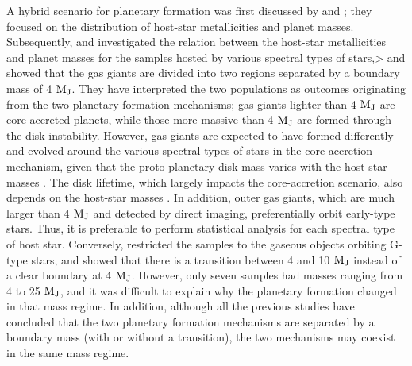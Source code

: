 \documentclass[twocolumn]{aastex62}
\begin{document}
\begin{CJK*}{UTF8}{min}
A hybrid scenario for planetary formation was first discussed by \cite{2007A&A...464..779R} and \cite{2007ApJ...662.1282M}; they focused on the distribution of host-star metallicities and planet masses. Subsequently, \cite{2017A&A...603A..30S} and \cite{2018AJ....156..221N} investigated the relation between the host-star metallicities and planet masses for the samples hosted by various spectral types of stars,> and showed that the gas giants are divided into two regions separated by a boundary mass of 4 $\rm M_J$. They have interpreted the two populations as outcomes originating from the two planetary formation mechanisms; gas giants lighter than 4 $\rm M_J$ are core-accreted planets, while those more massive than 4 $\rm M_J$ are formed through the disk instability. However, gas giants are expected to have formed differently and evolved around the various spectral types of stars in the core-accretion mechanism, given that the proto-planetary disk mass varies with the host-star masses \citep{2005ApJ...626.1045I}. The disk lifetime, which largely impacts the core-accretion scenario, also depends on the host-star masses \citep{2015A&A...576A..52R}. In addition, outer gas giants, which are much larger than 4 $\rm M_J$ and detected by direct imaging, preferentially orbit early-type stars. Thus, it is preferable to perform statistical analysis for each spectral type of host star. Conversely, \cite{2018ApJ...853...37S} restricted the samples to the gaseous objects orbiting G-type stars, and showed that there is a transition between 4 and 10 $\rm M_J$ instead of a clear boundary at 4 $\rm M_J$. However, only seven samples had masses ranging from 4 to 25 $\rm M_J$, and it was difficult to explain why the planetary formation changed in that mass regime. In addition, although all the previous studies have concluded that the two planetary formation mechanisms are separated by a boundary mass (with or without a transition), the two mechanisms may coexist in the same mass regime.


\end{CJK*}
\end{document}
